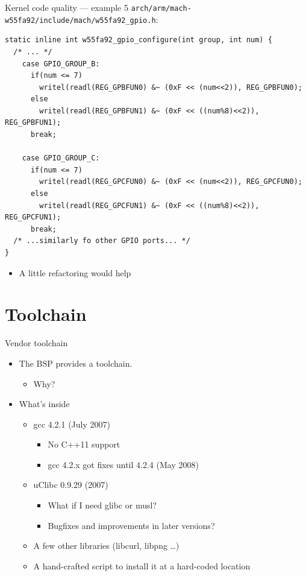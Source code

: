 \documentclass[xetex,table,aspectratio=169]{beamer}
\begin{document}
\begin{frame}[fragile]{Kernel code quality --- example 5}
  \texttt{arch/arm/mach-w55fa92/include/mach/w55fa92\_gpio.h}:

  \linespread{1}
  \begin{verbatim}
static inline int w55fa92_gpio_configure(int group, int num) {
  /* ... */
    case GPIO_GROUP_B:
      if(num <= 7)
        writel(readl(REG_GPBFUN0) &~ (0xF << (num<<2)), REG_GPBFUN0);
      else
        writel(readl(REG_GPBFUN1) &~ (0xF << ((num%8)<<2)), REG_GPBFUN1);
      break;

    case GPIO_GROUP_C:
      if(num <= 7)
        writel(readl(REG_GPCFUN0) &~ (0xF << (num<<2)), REG_GPCFUN0);
      else
        writel(readl(REG_GPCFUN1) &~ (0xF << ((num%8)<<2)), REG_GPCFUN1);
      break;
  /* ...similarly fo other GPIO ports... */
}
  \end{verbatim}

  \begin{itemize}
  \item A little refactoring would help
  \end{itemize}
\end{frame}

\section{Toolchain}

\begin{frame}{Vendor toolchain}
  \begin{itemize}
  \item The BSP provides a toolchain.
    \begin{itemize}
    \item Why?
    \end{itemize}
  \item What's inside
    \begin{itemize}
    \item gcc 4.2.1 (July 2007)
      \begin{itemize}
      \item No C++11 support
      \item gcc 4.2.x got fixes until 4.2.4 (May 2008)
      \end{itemize}
    \item uClibc 0.9.29 (2007)
      \begin{itemize}
      \item What if I need glibc or musl?
      \item Bugfixes and improvements in later versions?
      \end{itemize}
    \item A few other libraries (libcurl, libpng \dots)
    \item A hand-crafted script to install it at a hard-coded location
    \end{itemize}
  \end{itemize}
\end{frame}
\end{document}
